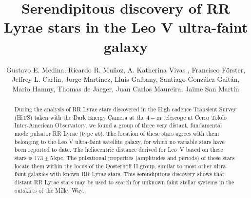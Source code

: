 \documentclass[iop]{emulateapj}
\begin{document}
\title{Serendipitous discovery of RR Lyrae stars in the Leo V ultra-faint galaxy}

\author{Gustavo E. Medina, Ricardo R. Mu\~noz, A. Katherina Vivas , Francisco F\"{o}rster, Jeffrey L. Carlin, Jorge Martinez, Lluis Galbany, Santiago Gonz\'alez-Gait\'an,  Mario Hamuy, Thomas de Jaeger, Juan Carlos Maureira, Jaime San Mart\'in
}



\begin{abstract}
During the analysis of RR Lyrae stars discovered in the High cadence Transient Survey (HiTS) taken with the Dark Energy Camera at the $4-$m telescope at Cerro Tololo Inter-American Observatory, we found a group of three very distant, fundamental mode pulsator RR Lyrae (type $ab$). 
The location of these stars agrees with them belonging to the Leo V ultra-faint satellite galaxy, for which no variable stars have been reported to date. 
The heliocentric distance derived for Leo~V based on these stars is $173\pm5$\,kpc. 
The pulsational properties (amplitudes and periods) of these stars locate them within the locus of the Oosterhoff II group, similar to most other ultra-faint galaxies with known RR Lyrae stars. 
This serendipitous discovery shows that distant RR Lyrae stars may be used to search for unknown faint stellar systems in the outskirts of the Milky Way.
\end{abstract}

\maketitle
\end{document}
